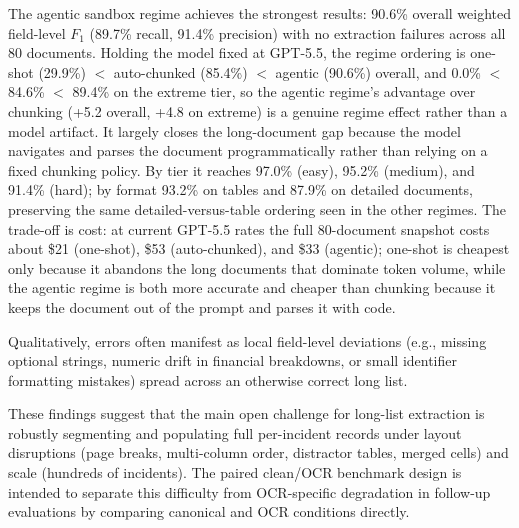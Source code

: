 The agentic sandbox regime achieves the strongest results: 90.6\% overall weighted field-level $F_1$ (89.7\% recall, 91.4\% precision) with no extraction failures across all 80 documents. Holding the model fixed at GPT-5.5, the regime ordering is one-shot (29.9\%) $<$ auto-chunked (85.4\%) $<$ agentic (90.6\%) overall, and 0.0\% $<$ 84.6\% $<$ 89.4\% on the extreme tier, so the agentic regime's advantage over chunking (+5.2 overall, +4.8 on extreme) is a genuine regime effect rather than a model artifact. It largely closes the long-document gap because the model navigates and parses the document programmatically rather than relying on a fixed chunking policy. By tier it reaches 97.0\% (easy), 95.2\% (medium), and 91.4\% (hard); by format 93.2\% on tables and 87.9\% on detailed documents, preserving the same detailed-versus-table ordering seen in the other regimes. The trade-off is cost: at current GPT-5.5 rates the full 80-document snapshot costs about \$21 (one-shot), \$53 (auto-chunked), and \$33 (agentic); one-shot is cheapest only because it abandons the long documents that dominate token volume, while the agentic regime is both more accurate and cheaper than chunking because it keeps the document out of the prompt and parses it with code.

Qualitatively, errors often manifest as local field-level deviations (e.g., missing optional strings, numeric drift in financial breakdowns, or small identifier formatting mistakes) spread across an otherwise correct long list.

These findings suggest that the main open challenge for long-list extraction is robustly segmenting and populating full per-incident records under layout disruptions (page breaks, multi-column order, distractor tables, merged cells) and scale (hundreds of incidents). The paired clean/OCR benchmark design is intended to separate this difficulty from OCR-specific degradation in follow-up evaluations by comparing canonical and OCR conditions directly.
